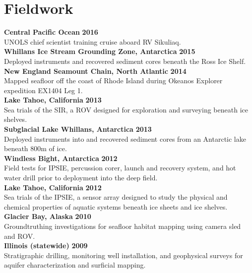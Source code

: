 \section{Fieldwork} 
\textbf{Central Pacific Ocean} \hfill \textbf{2016}\\
UNOLS chief scientist training cruise aboard RV Sikuliaq. \\
\vspace{2mm}
\textbf{Whillans Ice Stream Grounding Zone, Antarctica} \hfill \textbf{2015}\\
Deployed instruments and recovered sediment cores beneath the Ross Ice Shelf. \\
\vspace{2mm}
\textbf{New England Seamount Chain, North Atlantic} \hfill \textbf{2014}\\
Mapped seafloor off the coast of Rhode Island during Okeanos Explorer expedition EX1404 Leg 1. \\
\vspace{2mm}
\textbf{Lake Tahoe, California} \hfill \textbf{2013}\\
Sea trials of the SIR, a ROV designed for exploration and surveying beneath ice shelves. \\
\vspace{2mm}
\textbf{Subglacial Lake Whillans, Antarctica} \hfill \textbf{2013}\\
Deployed instruments into and recovered sediment cores from an Antarctic lake beneath 800m of ice.\\
\vspace{2mm}
\textbf{Windless Bight, Antarctica} \hfill \textbf{2012}\\
Field tests for IPSIE, percussion corer, launch and recovery system, and hot water drill prior to deployment into the deep field.\\
\vspace{2mm}
\textbf{Lake Tahoe, California} \hfill \textbf{2012}\\
Sea trials of the IPSIE, a sensor array designed to study the physical and chemical properties of aquatic systems beneath ice sheets and ice shelves. \\
\vspace{2mm}
\textbf{Glacier Bay, Alaska} \hfill \textbf{2010}\\
Groundtruthing investigations for seafloor habitat mapping using camera sled and ROV.\\
\vspace{2mm}
\textbf{Illinois (statewide)} \hfill \textbf{2009}\\
Stratigraphic drilling, monitoring well installation, and geophysical surveys for aquifer characterization and surficial mapping. \\

